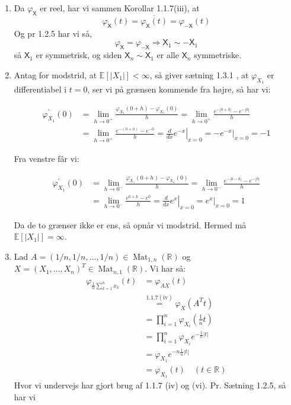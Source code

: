 \documentclass{Class}
\newcommand{\1}{\mathbbm{1}}
\newcommand{\X}{\mathsf{X}}
\newcommand{\varx}{\varphi_\X}
\theoremstyle{boxed}
\begin{document}
\begin{enumerate}
  \item Da $\varx$ er reel, har vi sammen Korollar 1.1.7(iii), at 
  $$\varx(t)=\overline{\varx(t)}=\varphi_{-\X}(t)$$
  Og pr 1.2.5 har vi så,
  $$\varx = \varphi_{-\X}\Rightarrow \X_1 \sim -\X_1$$ så $\X_1$ er symmetrisk, og siden $\X_n\sim \X_1$ er alle $\X_n$ symmetriske.
  \item Antag for modstrid, at $\mathbb{E}\left[\left|X_1\right|\right]<\infty$, så giver sætning 1.3.1 , at $\varphi_{X_1}$ er differentiabel i $t=0$, ser vi på grænsen kommende fra højre, så har vi:

  $$
  \begin{aligned}
  \varphi_{X_1}^{\prime}(0) & =\lim _{h \rightarrow 0^{+}} \frac{\varphi_{X_1}(0+h)-\varphi_{X_1}(0)}{h}=\lim _{h \rightarrow 0^{+}} \frac{e^{-|0+h|}-e^{-|0|}}{h} \\
  & =\lim _{h \rightarrow 0^{+}} \frac{e^{-(0+h)}-e^{-0}}{h}=\left.\frac{d}{d x} e^{-x}\right|_{x=0}=-\left.e^{-x}\right|_{x=0}=-1
  \end{aligned}
  $$
  
  
  Fra venstre fâr vi:
  
  $$
  \begin{aligned}
  \varphi_{X_1}^{\prime}(0) & =\lim _{h \rightarrow 0^{-}} \frac{\varphi_{X_1}(0+h)-\varphi_{X_1}(0)}{h}=\lim _{h \rightarrow 0^{-}} \frac{e^{-|0-h|}-e^{-|0|}}{h} \\
  & =\lim _{h \rightarrow 0^{-}} \frac{e^{0+h}-e^0}{h}=\left.\frac{d}{d x} e^x\right|_{x=0}=\left.e^x\right|_{x=0}=1
  \end{aligned}
  $$
  
  
  Da de to grænser ikke er ens, så opnår vi modstrid. Hermed må $\mathbb{E}\left[\left|X_1\right|\right]=\infty$.
\item Lad $ A=(1 / n, 1 / n, \ldots, 1 / n) \in \operatorname{Mat}_{1, n}(\mathbb{R})$ og $X=\left(X_1, \ldots, X_n\right)^T \in \operatorname{Mat}_{n, 1}(\mathbb{R})$.
  Vi har så:
  \begin{align*}
    \varphi_{\frac{1}{n} \sum_{k=1}^n x_k}(t)&=\varphi_{A X}(t) \\ &\stackrel{1.1 .7(\mathrm{iv})}{=} \varphi_X\left(A^T t\right)\\ &=\prod_{i=1}^n \varphi_{X_i}\left(\frac{1}{n} t\right)\\ &=\prod_{i=1}^n \varphi_{X_i} e^{-\frac{1}{n}|t|}\\ &=\varphi_{X_1} e^{-n \frac{1}{n}|t|}\\ &=\varphi_{X_1}(t) \quad(t \in \mathbb{R})
  \end{align*}  
  Hvor vi undervejs har gjort brug af 1.1.7 (iv) og (vi). Pr. Sætning 1.2.5, så har vi
  

\end{enumerate}
\end{document}
